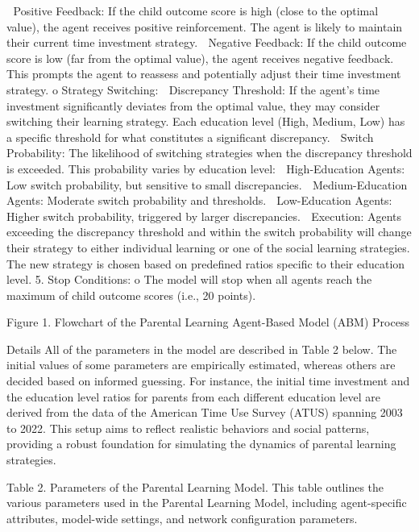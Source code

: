 	Positive Feedback: If the child outcome score is high (close to the optimal value), the agent receives positive reinforcement. The agent is likely to maintain their current time investment strategy.
	Negative Feedback: If the child outcome score is low (far from the optimal value), the agent receives negative feedback. This prompts the agent to reassess and potentially adjust their time investment strategy.
o	Strategy Switching:
	Discrepancy Threshold: If the agent's time investment significantly deviates from the optimal value, they may consider switching their learning strategy. Each education level (High, Medium, Low) has a specific threshold for what constitutes a significant discrepancy.
	Switch Probability: The likelihood of switching strategies when the discrepancy threshold is exceeded. This probability varies by education level:
	High-Education Agents: Low switch probability, but sensitive to small discrepancies.
	Medium-Education Agents: Moderate switch probability and thresholds.
	Low-Education Agents: Higher switch probability, triggered by larger discrepancies.
	Execution: Agents exceeding the discrepancy threshold and within the switch probability will change their strategy to either individual learning or one of the social learning strategies. The new strategy is chosen based on predefined ratios specific to their education level.
5.	Stop Conditions:
o	The model will stop when all agents reach the maximum of child outcome scores (i.e., 20 points).

 
Figure 1. Flowchart of the Parental Learning Agent-Based Model (ABM) Process

Details
All of the parameters in the model are described in Table 2 below. The initial values of some parameters are empirically estimated, whereas others are decided based on informed guessing. For instance, the initial time investment and the education level ratios for parents from each different education level are derived from the data of the American Time Use Survey (ATUS) spanning 2003 to 2022. This setup aims to reflect realistic behaviors and social patterns, providing a robust foundation for simulating the dynamics of parental learning strategies. 
 
Table 2. Parameters of the Parental Learning Model. This table outlines the various parameters used in the Parental Learning Model, including agent-specific attributes, model-wide settings, and network configuration parameters. 
